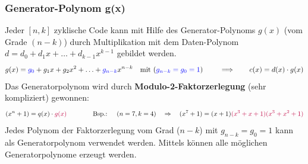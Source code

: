 \subsubsection{Generator-Polynom g(x)}
Jeder $[n,k]$ zyklische Code kann mit Hilfe des Generator-Polynoms $g(x)$ (vom Grade $(n-k)$)
durch Multiplikation mit dem Daten-Polynom $d=d_0 + d_1x + \ldots + d_{k-1}x^{k-1}$ gebildet werden.
$$ g(x) = \textcolor{blue}{g_0} + g_1 x + g_2 x^2 + \ldots + \textcolor{blue}{g_{n-k}} x^{n-k}
\quad \text{mit (} \textcolor{blue}{g_{n-k} = g_0 = 1} \text{) } \qquad \Longrightarrow \qquad
c(x) = d(x) \cdot g(x)$$
Das Generatorpolynom wird durch \textbf{Modulo-2-Faktorzerlegung} (sehr kompliziert) gewonnen: 
$$ (x^n + 1) = q(x) \cdot \textcolor{purple}{g(x)} \qquad \qquad \text{Bsp.: } \quad (n=7,k=4) \quad
\Rightarrow \quad (x^7 + 1) = (x+1)\textcolor{purple}{(x^3+x+1)(x^3+x^2+1)}$$ Jedes Polynom der
Faktorzerlegung vom Grad ($n-k$) mit $g_{n-k} = g_0 = 1$ kann als Generatorpolynom verwendet
werden. Mittels \textbf{} können alle möglichen Generatorpolynome
erzeugt werden.


